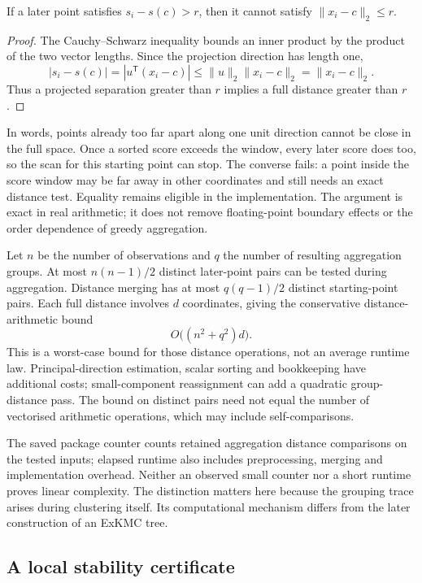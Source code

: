 \begin{proposition}
\label{prop:projection}
If a later point satisfies $s_i-s(c)>r$, then it cannot satisfy $\lVert x_i-c\rVert_2\leq r$.
\end{proposition}
\begin{proof}
The Cauchy--Schwarz inequality bounds an inner product by the product of the two vector lengths. Since the projection direction has length one,
\[
 |s_i-s(c)|=|u^{\mathsf T}(x_i-c)|
 \leq \lVert u\rVert_2\lVert x_i-c\rVert_2
 =\lVert x_i-c\rVert_2.
\]
Thus a projected separation greater than $r$ implies a full distance greater than $r$.
\end{proof}

In words, points already too far apart along one unit direction cannot be close in the full space. Once a sorted score exceeds the window, every later score does too, so the scan for this starting point can stop. The converse fails: a point inside the score window may be far away in other coordinates and still needs an exact distance test. Equality remains eligible in the implementation. The argument is exact in real arithmetic; it does not remove floating-point boundary effects or the order dependence of greedy aggregation.

Let $n$ be the number of observations and $q$ the number of resulting aggregation groups. At most $n(n-1)/2$ distinct later-point pairs can be tested during aggregation. Distance merging has at most $q(q-1)/2$ distinct starting-point pairs. Each full distance involves $d$ coordinates, giving the conservative distance-arithmetic bound
\[
 O\bigl((n^2+q^2)d\bigr).
\]
This is a worst-case bound for those distance operations, not an average runtime law. Principal-direction estimation, scalar sorting and bookkeeping have additional costs; small-component reassignment can add a quadratic group-distance pass. The bound on distinct pairs need not equal the number of vectorised arithmetic operations, which may include self-comparisons.

The saved package counter counts retained aggregation distance comparisons on the tested inputs; elapsed runtime also includes preprocessing, merging and implementation overhead. Neither an observed small counter nor a short runtime proves linear complexity. The distinction matters here because the grouping trace arises during clustering itself. Its computational mechanism differs from the later construction of an ExKMC tree.

\subsection{A local stability certificate}
\label{sec:local_certificate}


